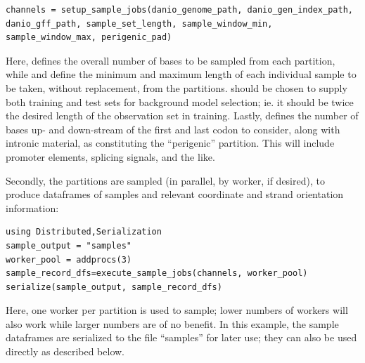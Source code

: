 \documentclass{ut-thesis}
\begin{document}
\begin{NoHyper}
\begin{verbatim}
channels = setup_sample_jobs(danio_genome_path, danio_gen_index_path, danio_gff_path, sample_set_length, sample_window_min, sample_window_max, perigenic_pad)
\end{verbatim}

Here,  defines the overall number of bases to be sampled from each partition, while  and  define the minimum and maximum length of each individual sample to be taken, without replacement, from the partitions.  should be chosen to supply both training and test sets for background model selection; ie. it should be twice the desired length of the observation set in training. Lastly,  defines the number of bases up- and down-stream of the first and last codon to consider, along with intronic material, as constituting the ``perigenic'' partition. This will include promoter elements, splicing signals, and the like.

Secondly, the partitions are sampled (in parallel, by worker, if desired), to produce dataframes of samples and relevant coordinate and strand orientation information:

\begin{verbatim}
using Distributed,Serialization
sample_output = "samples"
worker_pool = addprocs(3)
sample_record_dfs=execute_sample_jobs(channels, worker_pool)
serialize(sample_output, sample_record_dfs)
\end{verbatim}

Here, one worker per partition is used to sample; lower numbers of workers will also work while larger numbers are of no benefit. In this example, the sample dataframes are serialized to the file ``samples'' for later use; they can also be used directly as described below.


\end{NoHyper}
\end{document}

